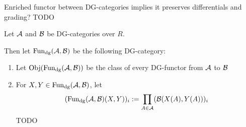 \begin{remark}
    Enriched functor between DG-categories implies it preserves differentials and grading? TODO
\end{remark}




    

\begin{definition}[\( \Fun_{\dg}(\Ac, \Bc) \)]
    Let \( {\mathcal{A}} \) and \( {\mathcal{B}} \) be DG-categories over \( R \).

    Then let \( \Fun_{\dg}(\Ac, \Bc) \) be the following DG-category:
    \begin{enumerate}
        \item{
            Let \( \operatorname{Obj}(\operatorname{Fun}_{\operatorname{dg}}({\mathcal{A}}, {\mathcal{B}})) \) be the class of every DG-functor from \( {\mathcal{A}} \) to \( {\mathcal{B}} \)
        }
        \item{
            For \( X, Y \in \operatorname{Fun}_{\operatorname{dg}}({\mathcal{A}}, {\mathcal{B}}) \), let
            \[
                (\operatorname{Fun}_{\operatorname{dg}}({\mathcal{A}}, {\mathcal{B}})(X, Y))_i
                := \prod_{A \in {\mathcal{A}}} ({\mathcal{B}}(X(A), Y(A)))_i
            \]
        }
        TODO
    \end{enumerate}
\end{definition}

